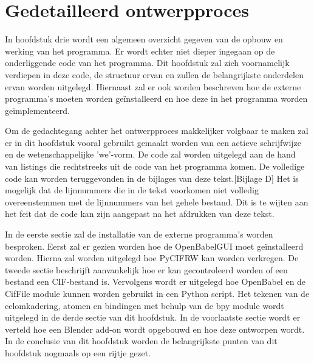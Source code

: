 

\chapter{Gedetailleerd ontwerpproces}

In hoofdstuk drie wordt een algemeen overzicht gegeven van de opbouw en werking van het programma. Er wordt echter niet dieper ingegaan op de onderliggende code van het programma. Dit hoofdstuk zal zich voornamelijk verdiepen in deze code, de structuur ervan en zullen de belangrijkste onderdelen ervan worden uitgelegd. Hiernaast zal er ook worden beschreven hoe de externe programma's moeten worden geïnstalleerd en hoe deze in het programma worden geïmplementeerd. 
\par
Om de gedachtegang achter het ontwerpproces makkelijker volgbaar te maken zal er in dit hoofdstuk vooral gebruikt gemaakt worden van een actieve schrijfwijze en de wetenschappelijke 'we'-vorm. De code zal worden uitgelegd aan de hand van listings die rechtstreeks uit de code van het programma komen. De volledige code kan worden teruggevonden in de bijlages van deze tekst.[Bijlage D] Het is mogelijk dat de lijnnummers die in de tekst voorkomen niet volledig overeenstemmen met de lijnnummers van het gehele bestand. Dit is te wijten aan het feit dat de code kan zijn aangepast na het afdrukken van deze tekst.
\par
In de eerste sectie zal de installatie van de externe programma's worden besproken. Eerst zal er gezien worden hoe de OpenBabelGUI moet geïnstalleerd worden. Hierna zal worden uitgelegd hoe PyCIFRW kan worden verkregen. De tweede sectie beschrijft aanvankelijk hoe er kan gecontroleerd worden of een bestand een CIF-bestand is. Vervolgens wordt er uitgelegd hoe OpenBabel en de CifFile module kunnen worden gebruikt in een Python script. Het tekenen van de celomkadering, atomen en bindingen met behulp van de bpy module wordt uitgelegd in de derde sectie van dit hoofdstuk. In de voorlaatste sectie wordt er verteld hoe een Blender add-on wordt opgebouwd en hoe deze ontworpen wordt. In de conclusie van dit hoofdstuk worden de belangrijkste punten van dit hoofdstuk nogmaals op een rijtje gezet.   

